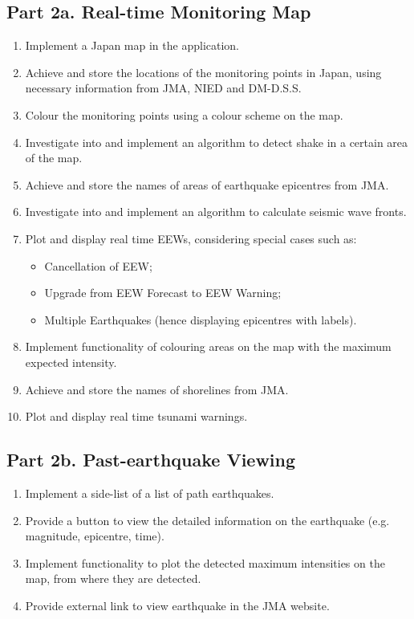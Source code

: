 \subsection{Part 2a. Real-time Monitoring Map}
\begin{enumerate}
    \item Implement a Japan map in the application.
    \item Achieve and store the locations of the monitoring points in Japan, using necessary information from JMA, NIED and DM-D.S.S.
    \item Colour the monitoring points using a colour scheme on the map.
    \item Investigate into and implement an algorithm to detect shake in a certain area of the map.
    \item Achieve and store the names of areas of earthquake epicentres from JMA.
    \item Investigate into and implement an algorithm to calculate seismic wave fronts.
    \item Plot and display real time EEWs, considering special cases such as:
          \begin{itemize}
              \item Cancellation of EEW;
              \item Upgrade from EEW Forecast to EEW Warning;
              \item Multiple Earthquakes (hence displaying epicentres with labels).
          \end{itemize}
    \item Implement functionality of colouring areas on the map with the maximum expected intensity.
    \item Achieve and store the names of shorelines from JMA.
    \item Plot and display real time tsunami warnings.
\end{enumerate}

\subsection{Part 2b. Past-earthquake Viewing}
\begin{enumerate}
    \item Implement a side-list of a list of path earthquakes.
    \item Provide a button to view the detailed information on the earthquake (e.g. magnitude, epicentre, time).
    \item Implement functionality to plot the detected maximum intensities on the map, from where they are detected.
    \item Provide external link to view earthquake in the JMA website.
\end{enumerate}

